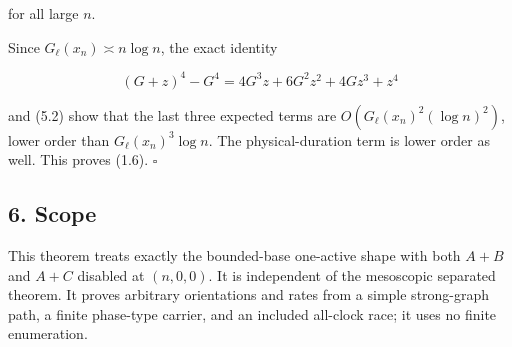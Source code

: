 for all large \(n\).

Since \(G_\ell(x_n)\asymp n\log n\), the exact identity

\[
 (G+z)^4-G^4=4G^3z+6G^2z^2+4Gz^3+z^4                       \tag{5.4}
\]

and (5.2) show that the last three expected terms are
\(O(G_\ell(x_n)^2(\log n)^2)\), lower order than
\(G_\ell(x_n)^3\log n\). The physical-duration term is lower order as
well. This proves (1.6). \(\square\)

\subsection{6. Scope}

This theorem treats exactly the bounded-base one-active shape with both
\(A+B\) and \(A+C\) disabled at \((n,0,0)\). It is independent of the
mesoscopic separated theorem. It proves arbitrary orientations and rates
from a simple strong-graph path, a finite phase-type carrier, and an
included all-clock race; it uses no finite enumeration.
